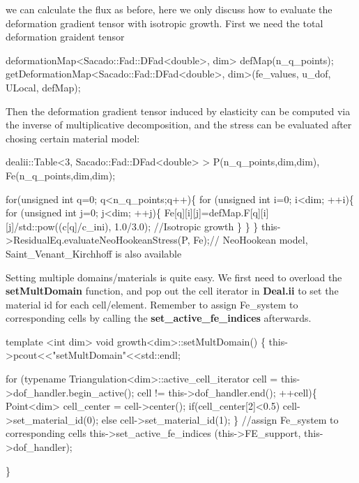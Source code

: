  we can calculate the flux as before, here we only discuss how to evaluate the deformation gradient tensor with isotropic growth. First we need the total deformation graident tensor 
\begin{DoxyCode}
deformationMap<Sacado::Fad::DFad<double>, dim> defMap(n\_q\_points); 
getDeformationMap<Sacado::Fad::DFad<double>, dim>(fe\_values, u\_dof, ULocal, defMap);
\end{DoxyCode}
 Then the deformation gradient tensor induced by elasticity can be computed via the inverse of multiplicative decomposition, and the stress can be evaluated after chosing certain material model\-: 
\begin{DoxyCode}
dealii::Table<3, Sacado::Fad::DFad<double> > P(n\_q\_points,dim,dim), Fe(n\_q\_points,dim,dim);

\textcolor{keywordflow}{for}(\textcolor{keywordtype}{unsigned} \textcolor{keywordtype}{int} q=0; q<n\_q\_points;q++)\{
    \textcolor{keywordflow}{for} (\textcolor{keywordtype}{unsigned} \textcolor{keywordtype}{int} i=0; i<dim; ++i)\{
        \textcolor{keywordflow}{for} (\textcolor{keywordtype}{unsigned} \textcolor{keywordtype}{int} j=0; j<dim; ++j)\{
        Fe[q][i][j]=defMap.F[q][i][j]/std::pow((c[q]/c\_ini), 1.0/3.0); \textcolor{comment}{//Isotropic growth}
        \}
    \}
\}
this->ResidualEq.evaluateNeoHookeanStress(P, Fe);\textcolor{comment}{// NeoHookean model, Saint\_Venant\_Kirchhoff is also
       available }
\end{DoxyCode}
 Setting multiple domains/materials is quite easy. We first need to overload the {\bfseries set\-Mult\-Domain} function, and pop out the cell iterator in {\bfseries Deal.\-ii} to set the material id for each cell/element. Remember to assign Fe\-\_\-system to corresponding cells by calling the {\bfseries set\-\_\-active\-\_\-fe\-\_\-indices} afterwards. 
\begin{DoxyCode}
\textcolor{keyword}{template} <\textcolor{keywordtype}{int} dim>
\textcolor{keywordtype}{void} growth<dim>::setMultDomain()
\{
    this->pcout<<\textcolor{stringliteral}{"setMultDomain"}<<std::endl;
    
  \textcolor{keywordflow}{for} (\textcolor{keyword}{typename} Triangulation<dim>::active\_cell\_iterator cell = this->dof\_handler.begin\_active(); cell != 
      this->dof\_handler.end(); ++cell)\{
    Point<dim> cell\_center = cell->center();
        \textcolor{keywordflow}{if}(cell\_center[2]<0.5) cell->set\_material\_id(0);
        \textcolor{keywordflow}{else} cell->set\_material\_id(1);
    \}
    \textcolor{comment}{//assign Fe\_system to corresponding cells}
    this->set\_active\_fe\_indices (this->FE\_support, this->dof\_handler);
    
\}
\end{DoxyCode}
